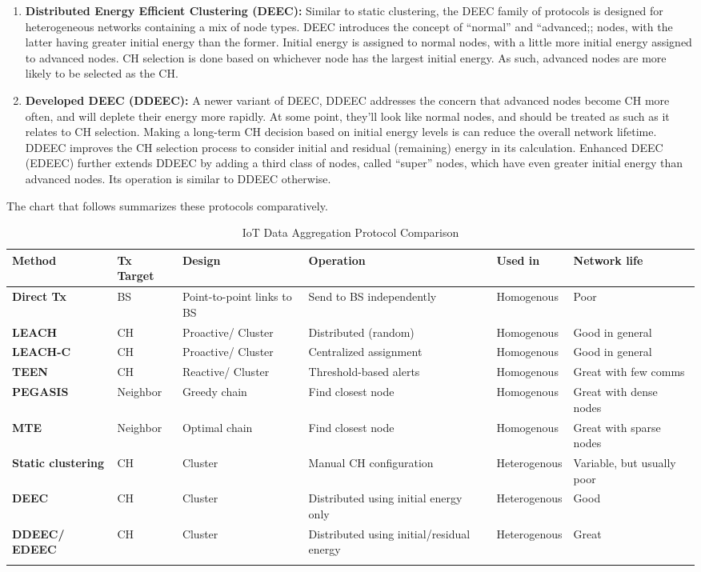 \begin{enumerate}
  \item \textbf{Distributed Energy Efficient Clustering (DEEC):} Similar to
  static clustering, the DEEC family of protocols is designed for
  heterogeneous networks containing a mix of node types. DEEC introduces the
  concept of ``normal'' and ``advanced;; nodes, with the latter having greater
  initial energy than the former. Initial energy is assigned to normal nodes,
  with a little more initial energy assigned to advanced nodes. CH selection
  is done based on whichever node has the largest initial energy. As such,
  advanced nodes are more likely to be selected as the CH.
  \item \textbf{Developed DEEC (DDEEC):} A newer variant of DEEC, DDEEC
  addresses the concern that advanced nodes become CH more often, and will
  deplete their energy more rapidly. At some point, they'll look like normal
  nodes, and should be treated as such as it relates to CH selection. Making a
  long-term CH decision based on initial energy levels is can reduce the
  overall network lifetime. DDEEC improves the CH selection process to
  consider initial and residual (remaining) energy in its calculation.
  Enhanced DEEC (EDEEC) further extends DDEEC by adding a third class of
  nodes, called ``super'' nodes, which have even greater initial energy than
  advanced nodes. Its operation is similar to DDEEC otherwise.
\end{enumerate}

The chart that follows summarizes these protocols comparatively. 

\begin{longtable}{KKKLKL}
\toprule
\textbf{Method}
&
\textbf{Tx Target}
&
\textbf{Design}
&
\textbf{Operation}
&
\textbf{Used in}
&
\textbf{Network life}
\\ \midrule
\textbf{Direct Tx}
&
BS
&
Point-to-point links to BS
&
Send to BS independently
&
Homogenous
&
Poor
\\ \midrule
\textbf{LEACH}
&
CH
&
Proactive/ Cluster
&
Distributed (random)
&
Homogenous
&
Good in general
\\ \midrule
\textbf{LEACH-C}
&
CH
&
Proactive/ Cluster
&
Centralized assignment
&
Homogenous
&
Good in general
\\ \midrule
\textbf{TEEN}
&
CH
&
Reactive/ Cluster
&
Threshold-based alerts
&
Homogenous
&
Great with few comms
\\ \midrule
\textbf{PEGASIS}
&
Neighbor
&
Greedy chain
&
Find closest node
&
Homogenous
&
Great with dense nodes
\\ \midrule
\textbf{MTE}
&
Neighbor
&
Optimal chain
&
Find closest node
&
Homogenous
&
Great with sparse nodes
\\ \midrule
\textbf{Static clustering}
&
CH
&
Cluster
&
Manual CH configuration
&
Heterogenous
&
Variable, but usually poor
\\ \midrule
\textbf{DEEC}
&
CH
&
Cluster
&
Distributed using initial energy only
&
Heterogenous
&
Good
\\ \midrule
\textbf{DDEEC/ EDEEC}
&
CH
&
Cluster
&
Distributed using initial/residual energy
&
Heterogenous
&
Great
\\
\bottomrule
\caption{IoT Data Aggregation Protocol Comparison}
\end{longtable}


